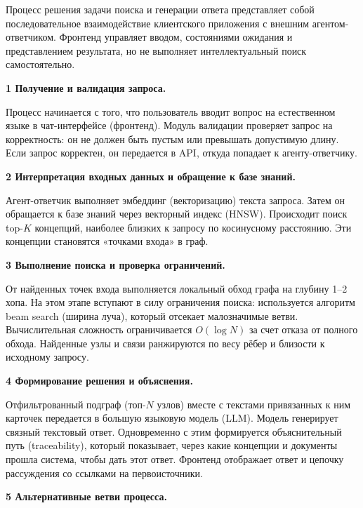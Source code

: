 Процесс решения задачи поиска и генерации ответа представляет собой последовательное взаимодействие клиентского приложения с внешним агентом-ответчиком. Фронтенд управляет вводом, состояниями ожидания и представлением результата, но не выполняет интеллектуальный поиск самостоятельно.

\vspace{0.5em}
\textbf{1 Получение и валидация запроса.}

Процесс начинается с того, что пользователь вводит вопрос на естественном языке в чат-интерфейсе (фронтенд). Модуль валидации проверяет запрос на корректность: он не должен быть пустым или превышать допустимую длину. Если запрос корректен, он передается в API, откуда попадает к агенту-ответчику.

\vspace{0.5em}
\textbf{2 Интерпретация входных данных и обращение к базе знаний.}

Агент-ответчик выполняет эмбеддинг (векторизацию) текста запроса. Затем он обращается к базе знаний через векторный индекс (HNSW). Происходит поиск top-$K$ концепций, наиболее близких к запросу по косинусному расстоянию. Эти концепции становятся «точками входа» в граф.

\vspace{0.5em}
\textbf{3 Выполнение поиска и проверка ограничений.}

От найденных точек входа выполняется локальный обход графа на глубину 1–2 хопа. На этом этапе вступают в силу ограничения поиска: используется алгоритм beam search (ширина луча), который отсекает малозначимые ветви. Вычислительная сложность ограничивается $O(\log N)$ за счет отказа от полного обхода. Найденные узлы и связи ранжируются по весу рёбер и близости к исходному запросу.

\vspace{0.5em}
\textbf{4 Формирование решения и объяснения.}

Отфильтрованный подграф (топ-$N$ узлов) вместе с текстами привязанных к ним карточек передается в большую языковую модель (LLM). Модель генерирует связный текстовый ответ. Одновременно с этим формируется объяснительный путь (traceability), который показывает, через какие концепции и документы прошла система, чтобы дать этот ответ. Фронтенд отображает ответ и цепочку рассуждения со ссылками на первоисточники.

\vspace{0.5em}
\textbf{5 Альтернативные ветви процесса.}

